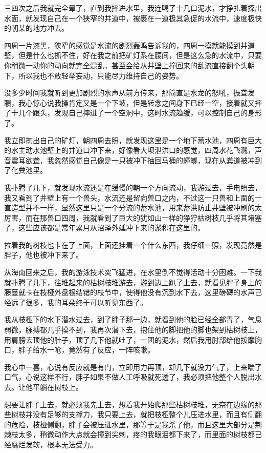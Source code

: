 三四次之后我就完全晕了，直到我摔进水里，我连喝了十几口泥水，才挣扎着探出水面，就发现自己在一个狭窄的井道中，被裹在一道极其急促的水流中，速度极快的朝某的地方冲去。

四周一片漆黑，狭窄的感觉是水流的剧烈轰鸣告诉我的，四周一摸就能摸到井道壁，但是什么也抓不住，好在我之前把矿灯系在腰间，但是这么急的水流中，只要你稍微一动你的动向就完全混乱，甚至会给从井壁上撞回来的乱流直接翻个头朝下，所以我也不敢轻举妄动，只能尽力维持自己的姿势。

没多少时间我就听到更加剧烈的水声从前方传来，那简直是水龙的怒吼，振聋发聩，我心惊心说我操肯定又是一个下坡，但是转念之间身下已经一空，接着就又摔了十几个跟头，发现自己摔进了一个空洞中，这时水流趋缓，可以控制自己的身形了。

我立即掏出自己的矿灯，朝四周去照，就发现这里是一个地下蓄水池，四周有巨大的水主动水池壁上的井道口冲下来，好像看大坝泄洪口的感觉，四周水花飞溅，声音震耳欲聋，我忽然感觉自己像是一只被冲下抽回马桶的蟑螂，现在从粪道被冲到了化粪池里。

我扑腾了几下，就发现水流还是在缓慢的朝一个方向流动，我游过去，手电照去，我又看到了井壁上有一个兽头，水流还是留向兽口之内，不过这一只兽和上面的一直造型并不一样，显然这里只是一个分流的蓄水池，用来蓄洪防止井壁被冲刷的太厉害，而在那兽口四周，我就看到了巨大的犹如山一样的狰狞枯树枝几乎将其堵塞了，这些应该都是常年累月从沼泽外延冲下来的淤积在这里的。

拉着我的树枝也卡在了上面，上面还挂着一个什么东西，我仔细一照，发现竟然是胖子，他也被冲下来了。

从海南回来之后，我的游泳技术突飞猛进，在水里倒不觉得活动十分困难。一下我就扑腾了几下，往堆起来的枯树枝堆游去，游到边上趴了上去，就看见胖子身上的藤蔓就卡在枝桠外盘根结错的枝节中，使得他没有沉到水下去，这里磅礴的水声已经远了很多，我的耳朵终于可以听见东西了。

我从枝桠下的水下潜水过去，到了胖子那一边，就看到他的脸已经全部青了，气息弱微，脉搏都几乎摸不到，我再次潜下去，抱住他的脚把他的脚也架到枯树枝上，用肩膀去顶他的肚子，顶了几下他就吐了，一团的泥水，然后我用肘部给他按摩胸口，胖子给水一呛，竟然有了反应，一阵咳嗽。

我心中一喜，心说有反应就是有门，立即用力再顶，却几下就没力气了，上来喘了口气，心说这样不行，胖子如果不做人工呼吸就死透了，我必须把他整个人脱出水去。让他平躺在树枝上。

想要让胖子上去，就必须我先上去，想着我开始爬那些枯树枝堆，无奈在边缘的那些树枝并没有足够的支撑力，我只要上去，就把枝桠整个儿压进水里，而且有侧翻的危险，枝桠侧翻，胖子会被压进水里，那等于是我杀了他，而且这里大部分是荆棘枝太多，稍微动作大点就会撞到尖刺，疼的我眼泪都下来了，而里面的树枝都已经腐烂发软，根本无法受力。

